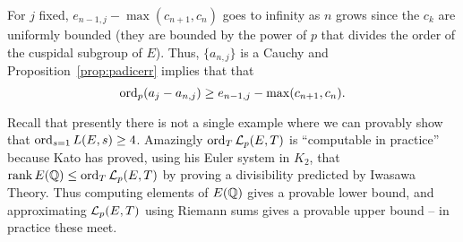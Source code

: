 
For $j$ fixed, $e_{n-1,j} - \max(c_{n+1}, c_n)$
goes to infinity as $n$ grows since the $c_k$ are uniformly
bounded (they are bounded by the power of $p$ that
divides the order of the cuspidal subgroup of $E$).
Thus, $\{ a_{n,j} \}$ is a 
Cauchy and Proposition~\ref{prop:padicerr} implies that that
$$
  \operatorname{ord}_p(a_j - a_{n,j}) \geq  e_{n-1,j} - \max(c_{n+1},c_n).
$$

\begin{remark}
Recall that presently there is not a single
example where we can provably show that 
  $\operatorname{ord}_{s=1} L(E,s) \geq 4$.  Amazingly $\operatorname{ord}_{T}
  \mathcal{L}_p(E,T)$ is ``computable in practice'' because Kato has proved,
using his Euler system in $K_2$, that
  $\operatorname{rank} E(\mathbb{Q}) \leq \operatorname{ord}_{T} \mathcal{L}_p(E,T)$ by proving a divisibility
predicted by Iwasawa Theory.  Thus computing elements of $E(\mathbb{Q})$ gives
a provable lower bound, and approximating $\mathcal{L}_p(E,T)$ using Riemann
sums gives a provable upper bound -- in practice these meet.
\end{remark}



